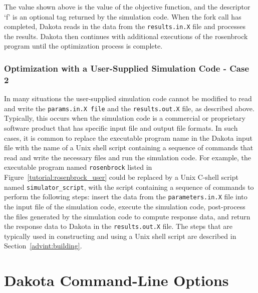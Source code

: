 The value shown above is the value of the objective function, and the
descriptor `f' is an optional tag returned by the simulation code.
When the fork call has completed, Dakota reads in the data from the
\texttt{results.in.X} file and processes the results. Dakota then
continues with additional executions of the rosenbrock program until
the optimization process is complete.

\subsubsection{Optimization with a User-Supplied Simulation Code - Case 2}\label{tutorial:examples:user_supply:optimization2}

In many situations the user-supplied simulation code cannot be
modified to read and write the \texttt{params.in.X file} and the
\texttt{results.out.X} file, as described above. Typically, this
occurs when the simulation code is a commercial or proprietary
software product that has specific input file and output file formats.
In such cases, it is common to replace the executable program name in
the Dakota input file with the name of a Unix shell script containing
a sequence of commands that read and write the necessary files and run
the simulation code. For example, the executable program named
\texttt{rosenbrock} listed in Figure~\ref{tutorial:rosenbrock_user}
could be replaced by a Unix C-shell script named
\texttt{simulator\_script}, with the script containing a sequence of
commands to perform the following steps: insert the data from the
\texttt{parameters.in.X} file into the input file of the simulation
code, execute the simulation code, post-process the files generated by
the simulation code to compute response data, and return the response
data to Dakota in the \texttt{results.out.X} file. The steps that are
typically used in constructing and using a Unix shell script are
described in Section~\ref{advint:building}.

\section{Dakota Command-Line Options}\label{tutorial:installation:running}

